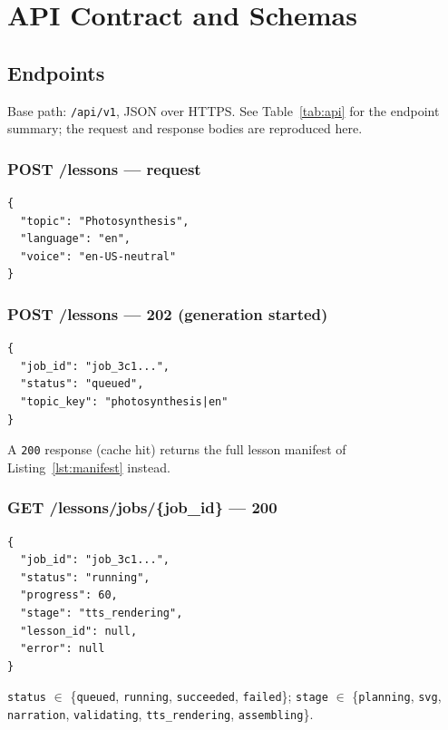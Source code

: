\chapter{API Contract and Schemas}
\label{app:api}

\section{Endpoints}

Base path: \texttt{/api/v1}, JSON over HTTPS. See Table~\ref{tab:api} for
the endpoint summary; the request and response bodies are reproduced here.

\subsection*{POST /lessons --- request}
\begin{lstlisting}[style=code]
{
  "topic": "Photosynthesis",
  "language": "en",
  "voice": "en-US-neutral"
}
\end{lstlisting}

\subsection*{POST /lessons --- 202 (generation started)}
\begin{lstlisting}[style=code]
{
  "job_id": "job_3c1...",
  "status": "queued",
  "topic_key": "photosynthesis|en"
}
\end{lstlisting}

A \texttt{200} response (cache hit) returns the full lesson manifest of
Listing~\ref{lst:manifest} instead.

\subsection*{GET /lessons/jobs/\{job\_id\} --- 200}
\begin{lstlisting}[style=code]
{
  "job_id": "job_3c1...",
  "status": "running",
  "progress": 60,
  "stage": "tts_rendering",
  "lesson_id": null,
  "error": null
}
\end{lstlisting}

\texttt{status} $\in$ \{\texttt{queued}, \texttt{running},
\texttt{succeeded}, \texttt{failed}\}; \texttt{stage} $\in$
\{\texttt{planning}, \texttt{svg}, \texttt{narration},
\texttt{validating}, \texttt{tts\_rendering}, \texttt{assembling}\}.

